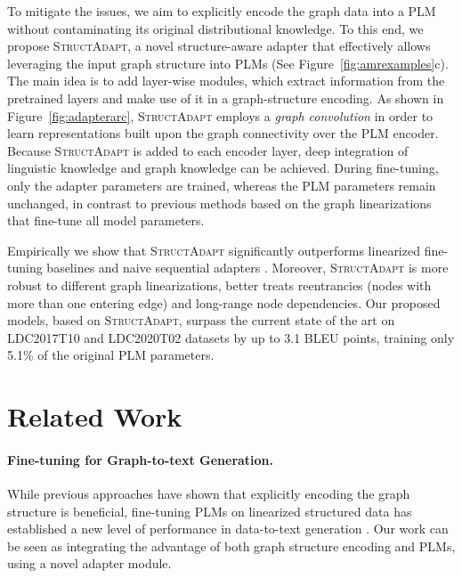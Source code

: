 \documentclass[11pt]{article}
\newcommand{\graphadapter}{{\small\textsc{StructAdapt}}\xspace}
\begin{document}
To mitigate the issues, we aim to explicitly encode the graph data into a PLM without contaminating its original distributional knowledge. To this end, we propose \graphadapter, a novel structure-aware adapter that effectively allows leveraging the input graph structure into PLMs (See Figure~\ref{fig:amrexamples}c). The main idea is to add layer-wise modules, which extract information from the pretrained layers and make use of it in a graph-structure encoding. As shown in Figure~\ref{fig:adapterarc}, \graphadapter employs a \emph{graph convolution} in order to learn representations built upon the graph connectivity over the PLM encoder. Because \graphadapter is added to each encoder layer, deep integration of linguistic knowledge and graph knowledge can be achieved. During fine-tuning, only the adapter parameters are trained, whereas the PLM parameters remain unchanged, in contrast to previous methods based on the graph linearizations that fine-tune all model parameters.

Empirically we show that \graphadapter significantly outperforms linearized fine-tuning baselines and naive sequential adapters \cite{pmlr-v97-houlsby19a}. Moreover, \graphadapter is more robust to different graph linearizations, better treats reentrancies (nodes with more than one entering edge) and long-range node dependencies. Our proposed models, based on \graphadapter, surpass the current state of the art on LDC2017T10 and LDC2020T02 datasets by up to 3.1 BLEU points, training only 5.1\% of the original PLM parameters.

\section{Related Work}

\paragraph{Fine-tuning for Graph-to-text Generation.} While previous approaches \cite{song-etal-2018-graph,ribeiro-etal-2019-enhancing, cai-lam-2020-graph, schmitt2020modeling, zhang-etal-2020-lightweight} have shown that explicitly encoding the graph structure is beneficial, fine-tuning PLMs on linearized structured data has established a new level of performance in data-to-text generation \cite{radev2020dart, kale2020texttotext, ribeiro2021smelting}. Our work can be seen as integrating the advantage of both graph structure encoding and PLMs, using a novel adapter module. 
\end{document}
